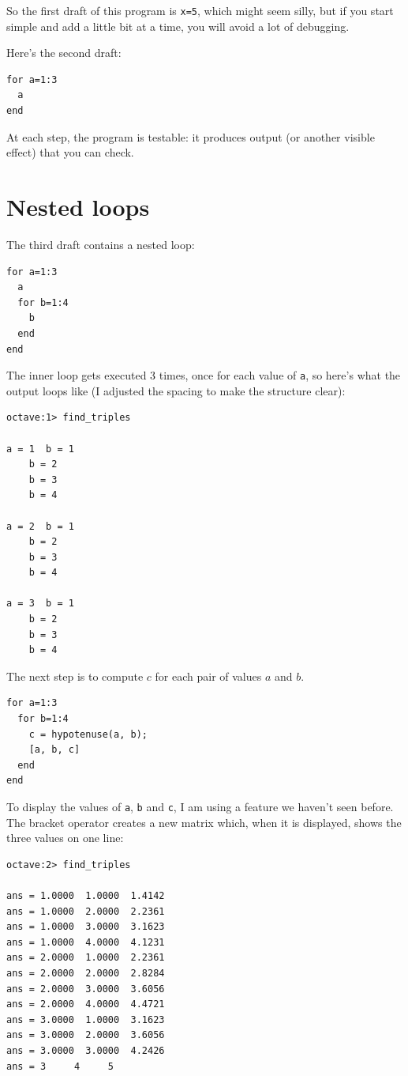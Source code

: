 \documentclass{book}
\begin{document}
So the first draft of this program is {\tt x=5}, which might seem
silly, but if you start simple and add a little bit at a time, you
will avoid a lot of debugging.

Here's the second draft:

\begin{verbatim}
for a=1:3
  a
end
\end{verbatim}

At each step, the program is testable: it produces output (or another
visible effect) that you can check.


\section{Nested loops}

The third draft contains a nested loop:

\begin{verbatim}
for a=1:3
  a
  for b=1:4
    b
  end
end
\end{verbatim}

The inner loop gets executed 3 times, once for each value of {\tt a},
so here's what the output loops like (I adjusted the spacing to make
the structure clear):

\begin{verbatim}
octave:1> find_triples

a = 1  b = 1
    b = 2
    b = 3
    b = 4

a = 2  b = 1
    b = 2
    b = 3
    b = 4

a = 3  b = 1
    b = 2
    b = 3
    b = 4
\end{verbatim}

The next step is to compute $c$ for each pair of values $a$ and $b$.

\begin{verbatim}
for a=1:3
  for b=1:4
    c = hypotenuse(a, b);
    [a, b, c]
  end
end
\end{verbatim}

To display the values of {\tt a}, {\tt b} and {\tt c}, I am
using a feature we haven't seen before. The bracket operator
creates a new matrix which, when it is displayed, shows the
three values on one line:

\begin{verbatim}
octave:2> find_triples

ans = 1.0000  1.0000  1.4142
ans = 1.0000  2.0000  2.2361
ans = 1.0000  3.0000  3.1623
ans = 1.0000  4.0000  4.1231
ans = 2.0000  1.0000  2.2361
ans = 2.0000  2.0000  2.8284
ans = 2.0000  3.0000  3.6056
ans = 2.0000  4.0000  4.4721
ans = 3.0000  1.0000  3.1623
ans = 3.0000  2.0000  3.6056
ans = 3.0000  3.0000  4.2426
ans = 3     4     5
\end{verbatim}
\end{document}
